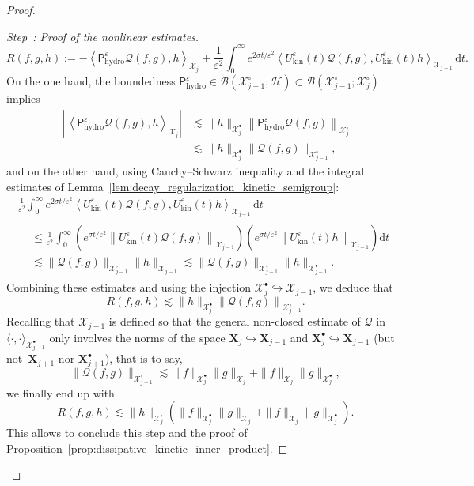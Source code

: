 \documentclass[10pt]{amsart}
\theoremstyle{definition}\newtheorem{defi}[theo]{Definition}\newtheorem{rema}[theo]{Remark}\newtheorem{exam}[theo]{Example}\newtheorem{exem}[theo]{Example}\newtheorem{nota}[theo]{Notation}
\newcommand{\hyd}{\mathrm{hydro}}
\newcommand{\kin}{\mathrm{kin}}
\renewcommand{\d}{\mathrm{d}}
\newcommand{\XX}{\mathcal{X}}
\newcommand{\HH}{\mathcal{H}}
\newcommand{\PP}{\mathsf{P}}
\newcommand{\QQ}{\mathcal{Q}}
\newcommand{\BBB}{\mathscr{B}}
\newcommand{\SSs}{\HH}
\newcommand{\Sh}{\bm{X}}
\newcommand{\Shp}{\bm{X}^{\bullet}}
\newcommand{\SSh}{\bm{\XX}}
\newcommand{\SShp}{\bm{\XX}^{\bullet}}
\newcommand{\SShm}{\bm{\XX}^{\circ}}
\renewcommand*\le{\leqslant}
\newcommand*\eps{{\varepsilon}}
\newcommand{\la}{\langle}
\newcommand{\ra}{\rangle}
\newcounter{stepcount}
\newenvironment{step}[1]{\refstepcounter{stepcount}\begin{proof}[Step~\thestepcount: #1]}{\let\qed\relax\end{proof}}
\begin{document}
\begin{proof}
\begin{step}{{Proof of the nonlinear estimates}}
\[
R(f, g, h) := - \left\la \PP^\eps_\hyd \QQ(f, g), h \right\ra_{\SSh_j } + \frac{1}{\eps^2} \int_0^\infty e^{2 \sigma t / \eps^2} \left\la U^\eps_\kin(t) \QQ(f, g), U^\eps_\kin(t) h \right\ra_{ \SSh_{j-1}} \, \d t.
\]
On the one hand, the boundedness $\PP^\eps_\hyd \in \BBB(\SShm_{j-1} ; \SSs) \subset \BBB(\SShm_{j-1} ;\SShm_{j})$ implies
\begin{align*}
\left|\, \left\la \PP^\eps_\hyd \QQ(f, g), h \right\ra_{\SSh_j} \right| & \lesssim \| h \|_{\SShp_{j} } \left\| \PP^\eps_\hyd \QQ(f, g) \right\|_{ \SShm_{j}} \\
& \lesssim \| h \|_{ \SShp_{j}} \| \QQ(f, g) \|_{ \SShm_{j-1}},
\end{align*}
and on the other hand, using Cauchy--Schwarz inequality and the integral estimates of Lemma~\ref{lem:decay_regularization_kinetic_semigroup}:
\begin{multline*}
\frac{1}{\eps^2} \int_0^\infty e^{2 \sigma t / \eps^2 } \left\la U^\eps_\kin(t) \QQ(f, g), U^\eps_\kin(t) h \right\ra_{ \SSh_{j-1}} \, \d t \\
\begin{aligned}
& \le \frac{1}{\eps^2} \int_0^\infty \left(e^{\sigma t / \eps^2} \left\| U^\eps_\kin(t) \QQ(f, g) \right\|_{ \SSh_{j-1}} \right) \left(e^{\sigma t / \eps^2} \left\| U^\eps_\kin(t) h \right\|_{ \SSh_{j-1}} \right) \d t \\
& \lesssim \| \QQ(f, g) \|_{ \SShm_{j-1}} \| h \|_{ \SSh_{j-1} } \lesssim \| \QQ(f, g) \|_{ \SShm_{j-1} } \| h \|_{ \SShp_{j-1} }.
\end{aligned}
\end{multline*}
Combining these estimates and using the injection $ \SShp_{j}\hookrightarrow \SSh_{j-1}$, we deduce that
\[
R(f, g, h) \lesssim \| h \|_{ \SShp_{j} } \left\| \QQ(f, g) \right\|_{ \SShm_{j-1} }.
\]
Recalling that $ \SSh_{j-1}$ is defined so that the general non-closed estimate of $\QQ$ in $\la \cdot, \cdot \ra_{\SShp_{j-1} }$ only involves the norms of the space $ \Sh_{j} \hookrightarrow \Sh_{j-1}$ and $\Shp_{j} \hookrightarrow \Sh_{j-1}$ (but not~$\Sh_{j+1}$ nor $\Shp_{j+1}$), that is to say,
\[
\| \QQ(f, g) \|_{ \SShm_{j-1} } \lesssim \| f \|_{ \SShp_{j} } \| g \|_{ \SSh_j} + \| f \|_{ \SSh_j} \| g \|_{ \SShp_{j}},
\]
we finally end up with
\[
R(f, g, h) \lesssim \| h \|_{ \SShm_{j} } \left(\| f \|_{ \SShp_{j} } \| g \|_{ \SSh_j} + \| f \|_{ \SSh_j } \| g \|_{ \SShp_{j} } \right).
\]
This allows to conclude this step and the proof of  Proposition~\ref{prop:dissipative_kinetic_inner_product}.\qedhere
\end{step}\let\qed\relax
\end{proof}
\end{document}
